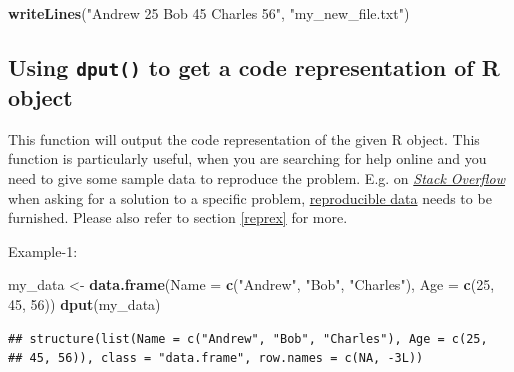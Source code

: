 \documentclass[
]{book}
\newenvironment{Shaded}{\begin{snugshade}}{\end{snugshade}}
\newcommand{\AttributeTok}[1]{\textcolor[rgb]{0.13,0.29,0.53}{#1}}
\newcommand{\DecValTok}[1]{\textcolor[rgb]{0.00,0.00,0.81}{#1}}
\newcommand{\FunctionTok}[1]{\textcolor[rgb]{0.13,0.29,0.53}{\textbf{#1}}}
\newcommand{\NormalTok}[1]{#1}
\newcommand{\OtherTok}[1]{\textcolor[rgb]{0.56,0.35,0.01}{#1}}
\newcommand{\StringTok}[1]{\textcolor[rgb]{0.31,0.60,0.02}{#1}}
\begin{document}
\begin{Shaded}
\begin{Highlighting}[]
\FunctionTok{writeLines}\NormalTok{(}\StringTok{"Andrew 25}
\StringTok{           Bob 45}
\StringTok{           Charles 56"}\NormalTok{, }\StringTok{"my\_new\_file.txt"}\NormalTok{)}
\end{Highlighting}
\end{Shaded}

\hypertarget{using-dput-to-get-a-code-representation-of-r-object}{%
\subsection*{\texorpdfstring{Using \texttt{dput()} to get a code representation of R object}{Using dput() to get a code representation of R object}}\label{using-dput-to-get-a-code-representation-of-r-object}}

This function will output the code representation of the given R object. This function is particularly useful, when you are searching for help online and you need to give some sample data to reproduce the problem. E.g. on \href{https://stackoverflow.com/}{\emph{Stack Overflow}} when asking for a solution to a specific problem, \href{https://stackoverflow.com/questions/5963269/how-to-make-a-great-r-reproducible-example}{reproducible data} needs to be furnished. Please also refer to section \ref{reprex} for more.

Example-1:

\begin{Shaded}
\begin{Highlighting}[]
\NormalTok{my\_data }\OtherTok{\textless{}{-}} \FunctionTok{data.frame}\NormalTok{(}\AttributeTok{Name =} \FunctionTok{c}\NormalTok{(}\StringTok{"Andrew"}\NormalTok{, }\StringTok{"Bob"}\NormalTok{, }\StringTok{"Charles"}\NormalTok{),}
                      \AttributeTok{Age =} \FunctionTok{c}\NormalTok{(}\DecValTok{25}\NormalTok{, }\DecValTok{45}\NormalTok{, }\DecValTok{56}\NormalTok{))}
\FunctionTok{dput}\NormalTok{(my\_data)}
\end{Highlighting}
\end{Shaded}

\begin{verbatim}
## structure(list(Name = c("Andrew", "Bob", "Charles"), Age = c(25, 
## 45, 56)), class = "data.frame", row.names = c(NA, -3L))
\end{verbatim}
\end{document}
